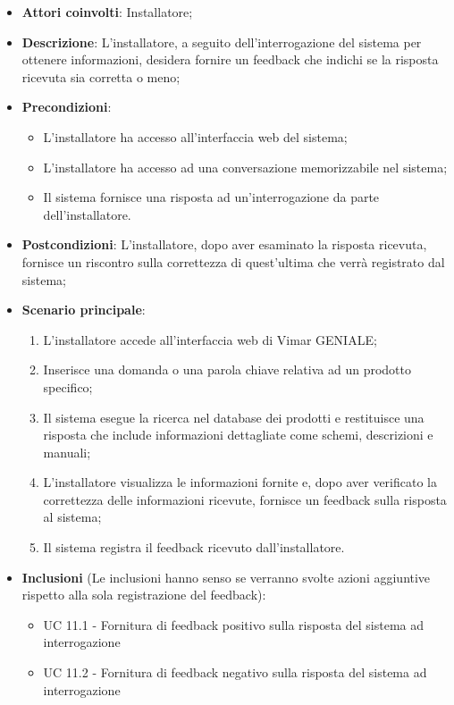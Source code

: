\begin{itemize}
    \item \textbf{Attori coinvolti}: Installatore;
    \item \textbf{Descrizione}: L’installatore, a seguito dell’interrogazione del sistema per ottenere informazioni, desidera fornire un feedback che indichi se la risposta ricevuta sia corretta o meno;
    \item \textbf{Precondizioni}: 
        \begin{itemize}
            \item L’installatore ha accesso all’interfaccia web del sistema;
            \item L’installatore ha accesso ad una conversazione memorizzabile nel sistema;
            \item Il sistema fornisce una risposta ad un’interrogazione da parte dell’installatore.
        \end{itemize}
    \item \textbf{Postcondizioni}: L’installatore, dopo aver esaminato la risposta ricevuta, fornisce un riscontro sulla correttezza di quest’ultima che verrà registrato dal sistema;
    \item \textbf{Scenario principale}:
    \begin{enumerate}
    \item L’installatore accede all’interfaccia web di Vimar GENIALE;
    \item Inserisce una domanda o una parola chiave relativa ad un prodotto specifico;
    \item Il sistema esegue la ricerca nel database dei prodotti e restituisce una risposta che include informazioni dettagliate come schemi, descrizioni e manuali;
    \item L’installatore visualizza le informazioni fornite e, dopo aver verificato la correttezza delle informazioni ricevute, fornisce un feedback sulla risposta al sistema;
    \item Il sistema registra il feedback ricevuto dall’installatore.
    \end{enumerate}
    \item \textbf{Inclusioni} (Le inclusioni hanno senso se verranno svolte azioni aggiuntive rispetto alla sola registrazione del feedback): 
        \begin{itemize}
            \item UC 11.1 - Fornitura di feedback positivo sulla risposta del sistema ad interrogazione
            \item UC 11.2 - Fornitura di feedback negativo sulla risposta del sistema ad interrogazione
        \end{itemize}
\end{itemize}

